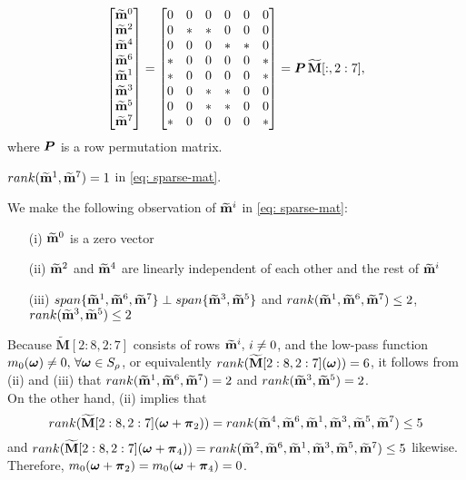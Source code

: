 \begin{align}
\label{eq: sparse-mat}
\begin{bmatrix}
\mrow{0}\\
\mrow{2}\\
\mrow{4}\\
\mrow{6}\\
\mrow{1}\\
\mrow{3}\\
\mrow{5}\\
\mrow{7}
\end{bmatrix}
=
\begin{bmatrix}
0 & 0 & 0 & 0 & 0 & 0\\
0 & * & * & 0 & 0 & 0\\
0 & 0 & 0 & * & * & 0\\
* & 0 & 0 & 0 & 0 & *\\
* & 0 & 0 & 0 & 0 & *\\
0 & 0 & * & * & 0 & 0\\
0 & 0 & * & * & 0 & 0\\
* & 0 & 0 & 0 & 0 & *
\end{bmatrix}
=\V{P}\,\widetilde{\mathbf{M}}[:,2:7],
\end{align}
where $\boldsymbol{P}$ is a row permutation matrix. 
\begin{lemma}\label{lem: rank1}
$rank(\widetilde{\mathbf{m}}^{1},\widetilde{\mathbf{m}}^{7}) = 1$ in \eqref{eq: sparse-mat}.
\end{lemma}
We make the following observation of $\widetilde{\mathbf{m}}^{i}$ in \eqref{eq: sparse-mat}:
\begin{itemize}
\item[(i)] $\widetilde{\mathbf{m}}^{0}$ is a zero vector
\item[(ii)] $\widetilde{\mathbf{m}}^{2}$ and $\widetilde{\mathbf{m}}^{4}$ are linearly independent of each other and the rest of $\widetilde{\mathbf{m}}^{i}$
\item[(iii)] $span\{\widetilde{\mathbf{m}}^{1},\widetilde{\mathbf{m}}^{6},\widetilde{\mathbf{m}}^{7}\} \perp span\{\widetilde{\mathbf{m}}^{3},\widetilde{\mathbf{m}}^{5}\}$ and $rank(\widetilde{\mathbf{m}}^{1},\widetilde{\mathbf{m}}^{6},\widetilde{\mathbf{m}}^{7}) \leq 2$, $rank(\widetilde{\mathbf{m}}^{3},\widetilde{\mathbf{m}}^{5})\leq 2$
\end{itemize}
Because $\widetilde{\mathbf{M}}[2:8,2:7]$ consists of rows $\widetilde{\mathbf{m}}^{i},\,i\neq 0$, and the low-pass function $m_0(\boldsymbol{\omega})\neq 0,\, \forall\boldsymbol{\omega}\in S_\rho$, or equivalently $rank(\widetilde{\mathbf{M}}[2:8,2:7](\boldsymbol{\omega})) = 6$, it follows from  (ii) and (iii) that $rank(\widetilde{\mathbf{m}}^{1},\widetilde{\mathbf{m}}^{6},\widetilde{\mathbf{m}}^{7}) = 2$ and $rank(\widetilde{\mathbf{m}}^{3},\widetilde{\mathbf{m}}^{5})= 2$.\\
On the other hand, (ii) implies that $$rank(\widetilde{\mathbf{M}}[2:8,2:7](\boldsymbol{\omega}+\boldsymbol{\pi}_2))=rank(\widetilde{\mathbf{m}}^{4},\widetilde{\mathbf{m}}^{6},\widetilde{\mathbf{m}}^{1},\widetilde{\mathbf{m}}^{3},\widetilde{\mathbf{m}}^{5},\widetilde{\mathbf{m}}^{7})\leq 5$$ and $rank(\widetilde{\mathbf{M}}[2:8,2:7](\boldsymbol{\omega}+\boldsymbol{\pi}_4))=rank(\widetilde{\mathbf{m}}^{2},\widetilde{\mathbf{m}}^{6},\widetilde{\mathbf{m}}^{1},\widetilde{\mathbf{m}}^{3},\widetilde{\mathbf{m}}^{5},\widetilde{\mathbf{m}}^{7})\leq 5$ likewise. Therefore, $m_0(\boldsymbol{\omega}+\boldsymbol{\pi}_2) = m_0(\boldsymbol{\omega}+\boldsymbol{\pi}_4) = 0$.\\
